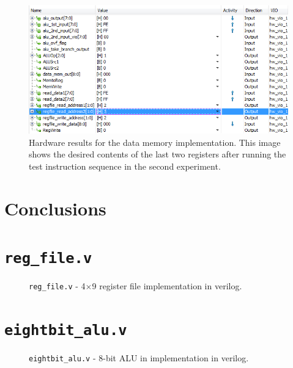 \documentclass[12pt, letterpaper]{article}
\begin{document}
\begin{figure}[h]
\includegraphics[width=\linewidth]{images/lab5-results-2.png}
\caption{Hardware results for the data memory implementation.  This image shows the desired contents of the last two registers after running the test instruction sequence in the second experiment.}
\end{figure}




\FloatBarrier\newpage
\section{Conclusions}



\newpage
\appendix
\appendixpage
\addappheadtotoc 

\section{\texttt{reg\_file.v}} \label{reg_file_module}
\FloatBarrier
\begin{figure}[h]
	
	\caption{\texttt{reg\_file.v} - 4$\times$9 register file implementation in verilog.}
\end{figure}
\FloatBarrier

\section{\texttt{eightbit\_alu.v}} \label{eightbit_alu}
\FloatBarrier
\begin{figure}[h]
	
	\caption{\texttt{eightbit\_alu.v} - 8-bit ALU in implementation in verilog.}
\end{figure}
\FloatBarrier
\end{document}
